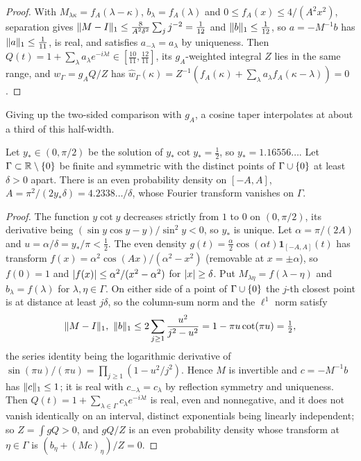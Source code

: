 \begin{proof}
With $M_{\lambda\kappa}=f_A(\lambda-\kappa)$, $b_\lambda=f_A(\lambda)$ and $0\le f_A(x)\le4/(A^2x^2)$, separation gives
$\lVert M-I\rVert_1\le\frac8{A^2\delta^2}\sum_j j^{-2}=\tfrac1{12}$ and $\lVert b\rVert_1\le\tfrac1{12}$, so $a=-M^{-1}b$ has $\lVert a\rVert_1\le\tfrac1{11}$, is real,
and satisfies $a_{-\lambda}=a_\lambda$ by uniqueness. Then $Q(t)=1+\sum_\lambda a_\lambda e^{-i\lambda t}\in[\tfrac{10}{11},\tfrac{12}{11}]$, its
$g_A$-weighted integral $Z$ lies in the same range, and $w_\Gamma=g_AQ/Z$ has
$\widehat w_\Gamma(\kappa)=Z^{-1}(f_A(\kappa)+\sum_\lambda a_\lambda f_A(\kappa-\lambda))=0$.
\end{proof}

Giving up the two-sided comparison with $g_A$, a cosine taper interpolates at about a third of this
half-width.

\begin{lemma}\label{fil:lem:cosine}
Let $y_*\in(0,\pi/2)$ be the solution of $y_*\cot y_*=\tfrac12$, so $y_*=1.16556\ldots$. Let
$\Gamma\subset\mathbb{R}\setminus\{0\}$ be finite and symmetric with the distinct points of $\Gamma\cup\{0\}$ at least $\delta>0$
apart. There is an even probability density on $[-A,A]$, $A=\pi^2/(2y_*\delta)=4.2338\ldots/\delta$, whose
Fourier transform vanishes on $\Gamma$.
\end{lemma}

\begin{proof}
The function $y\cot y$ decreases strictly from $1$ to $0$ on $(0,\pi/2)$, its derivative being
$(\sin y\cos y-y)/\sin^2y<0$, so $y_*$ is unique. Let $\alpha=\pi/(2A)$ and $u=\alpha/\delta=y_*/\pi<\tfrac12$. The even
density $g(t)=\tfrac\alpha2\cos(\alpha t)\mathbf1_{[-A,A]}(t)$ has transform $f(x)=\alpha^2\cos(Ax)/(\alpha^2-x^2)$ (removable at
$x=\pm\alpha$), so $f(0)=1$ and $\lvert f(x)\rvert\le\alpha^2/(x^2-\alpha^2)$ for $\lvert x\rvert\ge\delta$. Put $M_{\lambda\eta}=f(\lambda-\eta)$ and $b_\lambda=f(\lambda)$
for $\lambda,\eta\in\Gamma$. On either side of a point of $\Gamma\cup\{0\}$ the $j$-th closest point is at distance at least $j\delta$, so
the column-sum norm and the $\ell^1$ norm satisfy
\[
 \lVert M-I\rVert_1,\ \lVert b\rVert_1\le2\sum_{j\ge1}\frac{u^2}{j^2-u^2}=1-\pi u\cot(\pi u)=\tfrac12,
\]
the series identity being the logarithmic derivative of $\sin(\pi u)/(\pi u)=\prod_{j\ge1}(1-u^2/j^2)$. Hence $M$ is
invertible and $c=-M^{-1}b$ has $\lVert c\rVert_1\le1$; it is real with $c_{-\lambda}=c_\lambda$ by reflection symmetry and uniqueness.
Then $Q(t)=1+\sum_{\lambda\in\Gamma}c_\lambda e^{-i\lambda t}$ is real, even and nonnegative, and it does not vanish identically on an
interval, distinct exponentials being linearly independent; so $Z=\int gQ>0$, and $gQ/Z$ is an even probability
density whose transform at $\eta\in\Gamma$ is $(b_\eta+(Mc)_\eta)/Z=0$.
\end{proof}

